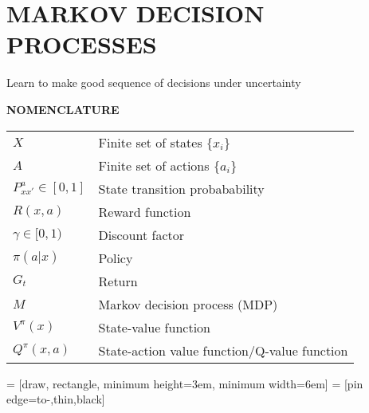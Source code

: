 \section{MARKOV DECISION PROCESSES}

Learn to make good sequence of decisions under uncertainty

\begin{yellowbox}{\textbf{NOMENCLATURE}}
    \begin{tabularx}{\columnwidth}{ll}
        $X$ & Finite set of states $\{x_i\}$\\
        \addlinespace[2pt]
        $A$ & Finite set of actions $\{a_i\}$\\
        $P_{xx'}^a\in[0,1]$ & State transition probabability\\
        $R(x,a)$ & Reward function\\
        $\gamma\in[0,1)$ & Discount factor\\
        $\pi(a|x)$ & Policy\\
        $G_t$ & Return\\
        $M$ & Markov decision process (MDP)\\
        $V^\pi(x)$ & State-value function\\
        $Q^\pi(x,a)$ & State-action value function/Q-value function\\
   
    \end{tabularx}
\end{yellowbox}

 = [draw, rectangle, minimum height=3em, minimum width=6em]
 = [pin edge={to-,thin,black}]


